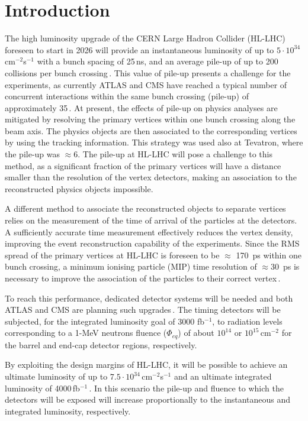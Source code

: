 \documentclass[3p,preprint,twocolumn]{elsarticle}
\begin{document}
\section{Introduction}

The high luminosity upgrade of the CERN Large Hadron Collider (HL-LHC) foreseen to start in 2026 will provide an instantaneous luminosity of up to $5 \cdot 10^{34}$\,cm$^{-2}$s$^{-1}$ with a bunch spacing of 25\,ns, and an average pile-up of up to 200 collisions per bunch crossing\,\cite{hlLhcTecDesRep}.
This value of pile-up presents a challenge for the experiments, as currently ATLAS and CMS have reached a typical number of concurrent interactions within the same bunch crossing (pile-up) of approximately 35\,\cite{atlasPileup,cmsPileup}.
At present, the effects of pile-up on physics analyses are mitigated by resolving the primary vertices within one bunch crossing along the beam axis.
The physics objects are then associated to the corresponding vertices by using the tracking information.
This strategy was used also at Tevatron, where the pile-up was $\approx 6$.
The pile-up at HL-LHC will pose a challenge to this method, as a significant fraction of the primary vertices will have a distance smaller than the resolution of the vertex detectors, making an association to the reconstructed physics objects impossible.

A different method to associate the reconstructed objects to separate vertices relies on the measurement of the time of arrival of the particles at the detectors.
A sufficiently accurate time measurement effectively reduces the vertex density, improving the event reconstruction capability of the experiments.
Since the RMS spread of the primary vertices at HL-LHC is foreseen to be $\approx$ 170~ps within one bunch crossing, a minimum ionising particle (MIP) time resolution of $\approx 30$~ps is necessary to improve the association of the particles to their correct vertex\,\cite{cmsMIPtiming,atlasMIPtiming}.

To reach this performance, dedicated detector systems will be needed and both ATLAS and CMS are planning such upgrades\,\cite{cmsMIPtiming,atlasMIPtiming}.
The timing detectors will be subjected, for the integrated luminosity goal of 3000 fb$^{-1}$, to radiation levels corresponding to a 1-MeV neutrons fluence ($\Phi_{eq}$) of about $10^{14}$ or $10^{15}$\,cm$^{-2}$ for the barrel and end-cap detector regions, respectively.

By exploiting the design margins of HL-LHC, it will be possible to achieve an ultimate luminosity of up to $7.5 \cdot 10^{34}$\,cm$^{-2}$s$^{-1}$ and an ultimate integrated luminosity of 4000\,fb$^{-1}$\,\cite{hlLhcTecDesRep}.
In this scenario the pile-up and fluence to which the detectors will be exposed will increase proportionally to the instantaneous and integrated luminosity, respectively.
\end{document}
